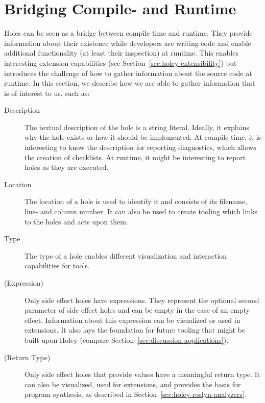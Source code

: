 \section{Bridging Compile- and Runtime}
\label{sec:holey-bridging-compile-and-runtime}
Holes can be seen as a bridge between compile time and runtime.
They provide information about their existence while developers are writing code and enable additional functionality (at least their inspection) at runtime.
This enables interesting extension capabilities (see Section~\ref{sec:holey-extensibility}) but introduces the challenge of how to gather information about the source code at runtime.
In this section, we describe how we are able to gather information that is of interest to us, such as:
\begin{description}
    \item[Description] The textual description of the hole is a string literal. Ideally, it explains why the hole exists or how it should be implemented. At compile time, it is interesting to know the description for reporting diagnostics, which allows the creation of checklists. At runtime, it might be interesting to report holes as they are executed.
    \item[Location] The location of a hole is used to identify it and consists of its filename, line- and column number. It can also be used to create tooling which links to the holes and acts upon them.
    \item[Type] The type of a hole enables different visualization and interaction capabilities for tools.
    \item[(Expression)] Only side effect holes have expressions. They represent the optional second parameter of side effect holes and can be empty in the case of an empty effect. Information about this expression can be visualized or used in extensions. It also lays the foundation for future tooling that might be built upon Holey (compare Section~\ref{sec:discussion-applications}).
    \item[(Return Type)] Only side effect holes that provide values have a meaningful return type. It can also be visualized, used for extensions, and provides the basis for program synthesis, as described in Section~\ref{sec:holey-roslyn-analyzers}.
\end{description}

